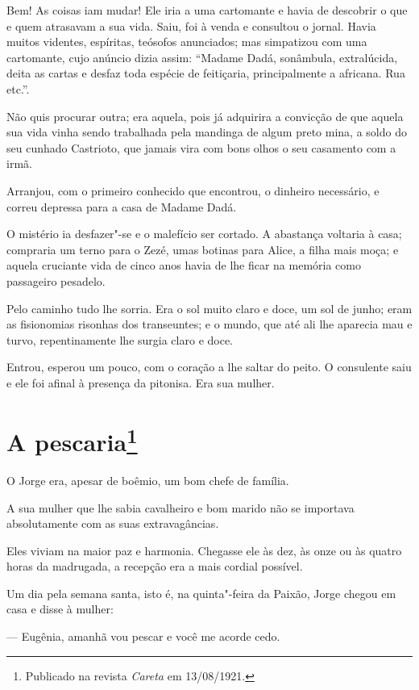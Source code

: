 Bem! As coisas iam mudar! Ele iria a uma cartomante e havia de descobrir
o que e quem atrasavam a sua vida. Saiu, foi à venda e consultou o
jornal. Havia muitos videntes, espíritas, teósofos anunciados; mas
simpatizou com uma cartomante, cujo anúncio dizia assim: ``Madame Dadá,
sonâmbula, extralúcida, deita as cartas e desfaz toda espécie de
feitiçaria, principalmente a africana. Rua etc.''.

Não quis procurar outra; era aquela, pois já adquirira a convicção de
que aquela sua vida vinha sendo trabalhada pela mandinga de algum preto
mina, a soldo do seu cunhado Castrioto, que jamais vira com bons olhos o
seu casamento com a irmã.

Arranjou, com o primeiro conhecido que encontrou, o dinheiro necessário,
e correu depressa para a casa de Madame Dadá.

O mistério ia desfazer"-se e o malefício ser cortado. A abastança
voltaria à casa; compraria um terno para o Zezé, umas botinas para
Alice, a filha mais moça; e aquela cruciante vida de cinco anos havia de
lhe ficar na memória como passageiro pesadelo.

Pelo caminho tudo lhe sorria. Era o sol muito claro e doce, um sol de
junho; eram as fisionomias risonhas dos transeuntes; e o mundo, que até
ali lhe aparecia mau e turvo, repentinamente lhe surgia claro e doce.

Entrou, esperou um pouco, com o coração a lhe saltar do peito. O
consulente saiu e ele foi afinal à presença da pitonisa. Era sua mulher.



\chapter[A pescaria]{A pescaria\footnote[*]{Publicado na revista \emph{Careta} em 13/08/1921.}}

O Jorge era, apesar de boêmio, um bom chefe de família.

A sua mulher que lhe sabia cavalheiro e bom marido não se importava
absolutamente com as suas extravagâncias.

Eles viviam na maior paz e harmonia. Chegasse ele às dez, às onze ou às
quatro horas da madrugada, a recepção era a mais cordial possível.

Um dia pela semana santa, isto é, na quinta"-feira da Paixão, Jorge
chegou em casa e disse à mulher:

--- Eugênia, amanhã vou pescar e você me acorde cedo.

